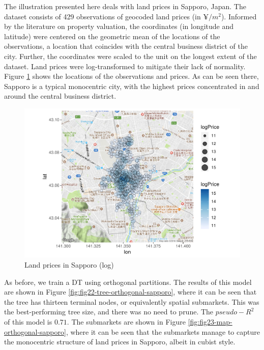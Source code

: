 \documentclass[]{elsarticle} %
\makeatletter
\def\maxwidth{\ifdim\Gin@nat@width>\linewidth\linewidth
\else\Gin@nat@width\fi}
\let\Oldincludegraphics\includegraphics
\renewcommand{\includegraphics}[1]{\Oldincludegraphics[width=\maxwidth]{#1}}
\makeatother
\begin{document}
The illustration presented here deals with land prices in Sapporo,
Japan. The dataset consists of 429 observations of geocoded land prices
(in \(\yen/m^2\)). Informed by the literature on property valuation, the
coordinates (in longitude and latitude) were centered on the geometric
mean of the locations of the observations, a location that coincides
with the central business district of the city. Further, the coordinates
were scaled to the unit on the longest extent of the dataset. Land
prices were log-transformed to mitigate their lack of normality. Figure
\ref{fig:fig21-map-sapporo} shows the locations of the observations and
prices. As can be seen there, Sapporo is a typical monocentric city,
with the highest prices concentrated in and around the central business
district.

\begin{figure}[htbp]
\centering
\includegraphics{Trees_with_Base_Functions_v2_files/figure-latex/fig21-map-sapporo-1.pdf}
\caption{\label{fig:fig21-map-sapporo}Land prices in Sapporo (log)}
\end{figure}

As before, we train a DT using orthogonal partitions. The results of
this model are shown in Figure \ref{fig:fig22-tree-orthogonal-sapporo},
where it can be seen that the tree has thirteen terminal nodes, or
equivalently spatial submarkets. This was the best-performing tree size,
and there was no need to prune. The \(pseudo-R^2\) of this model is
\(0.71\). The submarkets are shown in Figure
\ref{fig:fig23-map-orthogonal-sapporo}, where it can be seen that the
submarkets manage to capture the monocentric structure of land prices in
Sapporo, albeit in cubist style.
\end{document}
